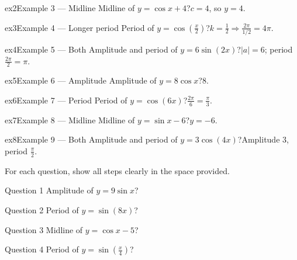 \documentclass[11pt]{article}
\begin{document}
\begin{example}{ex2}{Example 3 --- Midline}
Midline of $y=\cos x+4$?\soln $c=4$, so $y=4$.
\end{example}

\begin{example}{ex3}{Example 4 --- Longer period}
Period of $y=\cos(\tfrac{x}{2})$?\soln $k=\tfrac12\Rightarrow\tfrac{2\pi}{1/2}=4\pi$.
\end{example}

\begin{example}{ex4}{Example 5 --- Both}
Amplitude and period of $y=6\sin(2x)$?\soln $|a|=6$; period $\tfrac{2\pi}{2}=\pi$.
\end{example}

\begin{example}{ex5}{Example 6 --- Amplitude}
Amplitude of $y=8\cos x$?\soln $8$.
\end{example}

\begin{example}{ex6}{Example 7 --- Period}
Period of $y=\cos(6x)$?\soln $\tfrac{2\pi}{6}=\tfrac{\pi}{3}$.
\end{example}

\begin{example}{ex7}{Example 8 --- Midline}
Midline of $y=\sin x-6$?\soln $y=-6$.
\end{example}

\begin{example}{ex8}{Example 9 --- Both}
Amplitude and period of $y=3\cos(4x)$?\soln Amplitude $3$, period $\tfrac{\pi}{2}$.
\end{example}

\clearpage
{}
For each question, show all steps clearly in the space provided.

\begin{qbox}{Question 1}
Amplitude of $y=9\sin x$?\workspace{2.4cm}
\end{qbox}

\begin{qbox}{Question 2}
Period of $y=\sin(8x)$?\workspace{2.4cm}
\end{qbox}

\begin{qbox}{Question 3}
Midline of $y=\cos x-5$?\workspace{2.4cm}
\end{qbox}

\begin{qbox}{Question 4}
Period of $y=\sin(\tfrac{x}{4})$?\workspace{2.4cm}
\end{qbox}
\end{document}
